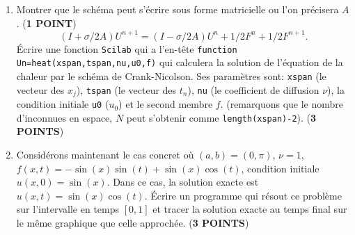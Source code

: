 \documentclass[12pt,a4paper]{article}
\begin{document}
\begin{enumerate}
\item Montrer que le sch\'ema peut s'\'ecrire sous forme matricielle
  ou l'on pr\'ecisera $A$. ({\bf 1 POINT})
$$
(I+\sigma/2 A)U^{n+1}= (I-\sigma/2 A)U^{n}+1/2
F^n+1/2 F^{n+1}.
$$
\newpage
\'Ecrire une fonction \texttt{Scilab} qui a l'en-t\^ete
  \texttt{function Un=heat(xspan,tspan,nu,u0,f)} qui
  calculera la solution de l'\'equation de la chaleur par le sch\'ema
  de Crank-Nicolson. Ses param\`etres sont: \texttt{xspan} (le vecteur des $x_j$),
  \texttt{tspan} (le vecteur des $t_n$), \texttt{nu} (le coefficient de
  diffusion $\nu$), la condition initiale \texttt{u0} ($u_0$) et le
  second membre $f$. (remarquons que le nombre d'inconnues en espace, $N$ peut
  s'obtenir comme \texttt{length(xspan)-2}). ({\bf 3 POINTS})
\vspace{10cm}

\item Consid\'erons maintenant le cas concret o\`u $(a,b) = (0,\pi)$,
  $\nu= 1$, $f (x, t) = -\sin(x) \sin(t) + \sin(x)\cos(t)$, condition
  initiale $u(x, 0) = \sin(x)$. Dans ce cas, la solution exacte est
  $u(x,t) = \sin(x)\cos(t)$. \'Ecrire un programme qui r\'esout ce probl\`eme sur
  l'intervalle en temps $[0,1]$ et tracer la solution exacte au temps
  final sur le m\^eme graphique que celle approch\'ee. ({\bf 3 POINTS})
\end{enumerate}
\end{document}
